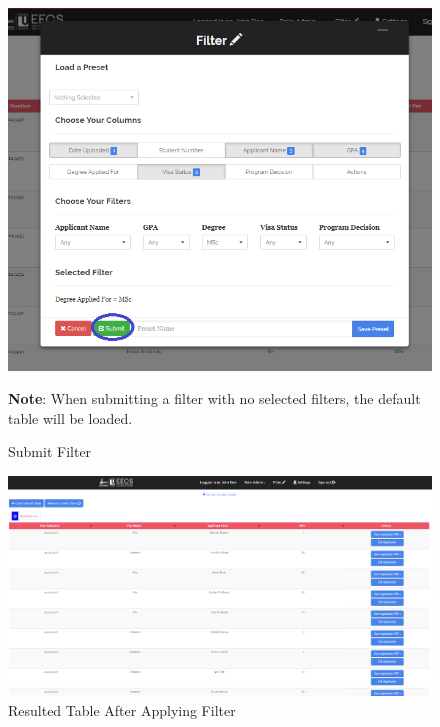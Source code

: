 \documentclass[fontsize=12pt,paper=letter,twoside]{scrartcl}
\begin{document}
\begin{enumerate}
\begin{figure}[!htb]
\begin{center}
\includegraphics[width=.99\textwidth]{images/adm/ma/submit_filter.png}
\end{center}
\caption{Submit Filter}
\textbf{Note}: When submitting a filter with no selected filters, the default table will be loaded.
\label{fig:adm/submit_filter}
\end{figure}

\begin{figure}[!htb]
\begin{center}
\includegraphics[width=.99\textwidth]{images/adm/ma/example_filter_table.png}
\end{center}
\caption{Resulted Table After Applying Filter}
\label{fig:adm/resulted_table}
\end{figure}


\end{enumerate}
\end{document}
